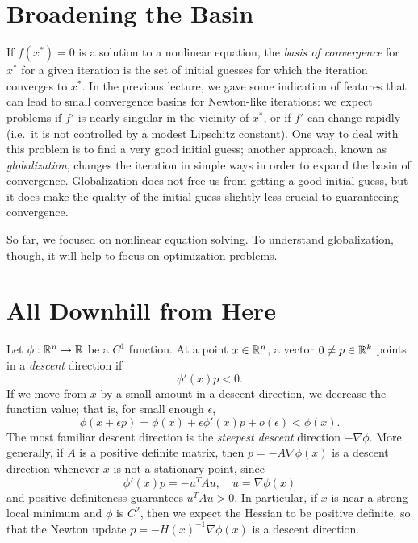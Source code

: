 \documentclass[12pt, leqno]{article} %
\begin{document}

\section*{Broadening the Basin}

If $f(x^*) = 0$ is a solution to a nonlinear equation, the {\em basis
  of convergence} for $x^*$ for a given iteration is the set of
initial guesses for which the iteration converges to $x^*$.  In the
previous lecture, we gave some indication of features that can lead to
small convergence basins for Newton-like iterations: we expect
problems if $f'$ is nearly singular in the vicinity of $x^*$, or if
$f'$ can change rapidly (i.e.~it is not controlled by a modest
Lipschitz constant).  One way to deal with this problem is to find
a very good initial guess; another approach, known
as {\em globalization}, changes the iteration in simple ways
in order to expand the basin of convergence.  Globalization does not
free us from getting a good initial guess, but it does make the
quality of the initial guess slightly less crucial to guaranteeing
convergence.

So far, we focused on nonlinear equation solving.  To understand
globalization, though, it will help to focus on optimization problems.

\section*{All Downhill from Here}

Let $\phi : \mathbb{R}^n \rightarrow \mathbb{R}$ be a $C^1$ function.
At a point $x \in \mathbb{R}^n$, a vector $0 \neq p \in \mathbb{R}^k$
points in a {\em descent} direction if
\[
  \phi'(x) p < 0.
\]
If we move from $x$ by a small amount in a descent direction, we
decrease the function value; that is, for small enough $\epsilon$,
\[
  \phi(x+\epsilon p)
  = \phi(x) + \epsilon \phi'(x) p + o(\epsilon)
  < \phi(x).
\]
The most familiar descent direction is the {\em steepest descent}
direction $-\nabla \phi$.  More generally, if $A$ is a positive
definite matrix, then $p = -A \nabla \phi(x)$ is a descent direction
whenever $x$ is not a stationary point, since
\[
  \phi'(x) p = -u^T A u, \quad u = \nabla \phi(x)
\]
and positive definiteness guarantees $u^T A u > 0$.  In particular,
if $x$ is near a strong local minimum and $\phi$ is $C^2$, then
we expect the Hessian to be positive definite, so that the Newton
update $p = -H(x)^{-1} \nabla \phi(x)$ is a descent direction.
\end{document}
